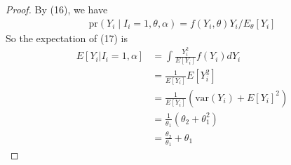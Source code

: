 \documentclass[letterpaper, 12pt]{article}
\newcommand{\pr}{\text{pr}}
\newcommand{\var}{\text{var}}
\newcommand{\sbs}{\;|\;} %
\begin{document}
\begin{enumerate}[(i)]
\begin{proof}
By (16), we have
\begin{align}
\pr(Y_i \sbs I_i =1, \theta, \alpha) 
= f(Y_i, \theta) Y_i / E_\theta[Y_i]
\end{align}
So the expectation of (17) is 
\begin{align}
E[Y_i | I_i = 1, \alpha] 
&= \int \frac{Y_i^2}{E[Y_i]}f(Y_i) dY_i \\
&= \frac{1}{E[Y_i]} E[Y_i^2] \\
&= \frac{1}{E[Y_i]} (\var(Y_i) + E[Y_i]^2) \\
&= \frac{1}{\theta_1} (\theta_2 + \theta_1^2)\\
&= \frac{\theta_2}{\theta_1} + \theta_1
\end{align}
\end{proof}


\end{enumerate}
\end{document}
